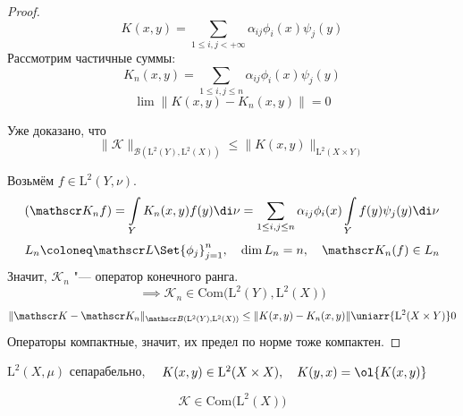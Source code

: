 \begin{proof}
	$$ K(x, y) = \sum_{1 \le i, j < +\infty} \alpha_{ij}\phi_i(x) \psi_j(y) $$
	Рассмотрим частичные суммы:
	$$ K_n(x, y) = \sum_{1 \le i,j \le n} \alpha_{ij} \phi_i(x) \psi_j(y) $$
	$$ \lim \|K(x, y) - K_n(x, y)\| = 0 $$

	Уже доказано, что
	$$ \|\mathscr K\|_{\mathscr B(\mathrm L^2(Y), \mathrm L^2(X))} \le
	\|K(x, y)\|_{\mathrm L^2(X \times Y)} $$

	Возьмём $ f \in \mathrm L^2(Y, \nu) $.
	$$ (\mathscr K_n f) = \int\limits_Y K_n(x, y) f(y) \di \nu =
	\sum_{1 \le i, j \le n} \alpha_{ij}\phi_i(x) \int\limits_Y f(y) \psi_j(y) \di \nu $$
	$$ L_n \coloneq \mathscr L\Set{\phi_j}_{j = 1}^n, \quad \dim L_n = n, \quad
	\mathscr K_n(f) \in L_n $$
	Значит, $ \mathscr K_n $ "--- оператор конечного ранга.
	$$ \implies \mathscr K_n \in \mathrm{Com} \bigl( \mathrm L^2(Y), \mathrm L^2(X) \bigr) $$
	$$ \|\mathscr K - \mathscr K_n\|_{\mathscr B(\mathrm L^2(Y), \mathrm L^2(X))} \le
	\|K(x, y) - K_n(x, y)\| \uniarr{\mathrm L^2(X \times Y)} 0 $$
	Операторы компактные, значит, их предел по норме тоже компактен.
\end{proof}

\begin{implication}
	$ \mathrm L^2(X, \mu) $ сепарабельно, $ \quad K(x, y) \in \mathrm L^2(X \times X), \quad
	K(y, x) = \ol{K(x, y)} $

	$$ \mathscr K \in \mathrm{Com} \bigl( \mathrm L^2(X) \bigr) $$
\end{implication}
